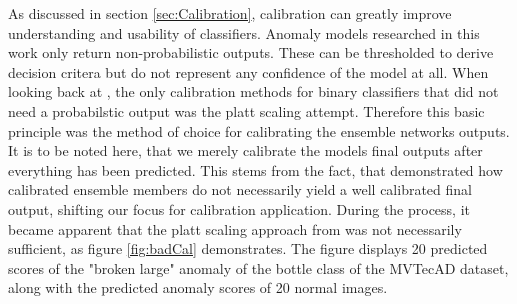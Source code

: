 As discussed in section \ref{sec:Calibration}, calibration can greatly improve understanding and usability of classifiers. Anomaly models researched in this work only return non-probabilistic 
outputs. These can be thresholded to derive decision critera but do not represent any confidence of the model at all. When looking back at \cite{Guo_2017_tempscalingetc}, the only calibration 
methods for binary classifiers that did not need a probabilstic output was the platt scaling attempt. Therefore this basic principle was the method of choice for calibrating the ensemble networks 
outputs. It is to be noted here, that we merely calibrate the models final outputs after everything has been predicted. This stems from the fact, that \cite{Wu_2021_shouldbecalibrated} demonstrated 
how calibrated ensemble members do not necessarily yield a well calibrated final output, shifting our focus for calibration application. During the process, it became apparent that the platt 
scaling approach from \cite{Guo_2017_tempscalingetc} was not necessarily sufficient, as figure \ref{fig:badCal} demonstrates. The figure displays 20 predicted scores of the "broken large" anomaly of the bottle class of the MVTecAD dataset, 
along with the predicted anomaly scores of 20 normal images.

